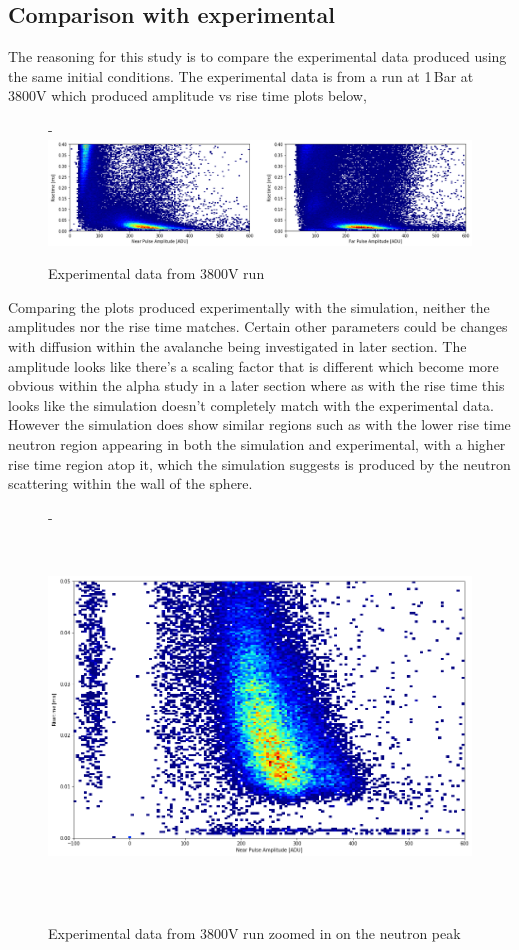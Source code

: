 \documentclass[a4paper]{article}
\begin{document}
\subsection{Comparison with experimental}
The reasoning for this study is to compare the experimental data produced using the same initial conditions. The experimental data is from a run at 1\,Bar at 3800V which produced amplitude vs rise time plots below,
\begin{figure}[H]-
        \centering
        \includegraphics[width=1\linewidth]{uk24n001_risehigh.png}
        \caption{Experimental data from 3800V run}
        \label{fig:south2d}
        \end{figure}
\noindent Comparing the plots produced experimentally with the simulation, neither the amplitudes nor the rise time matches. Certain other parameters could be changes with diffusion within the avalanche being investigated in later section. The amplitude looks like there's a scaling factor that is different which become more obvious within the alpha study in a later section where as with the rise time this looks like the simulation doesn't completely match with the experimental data.
\newline However the simulation does show similar regions such as with the lower rise time neutron region appearing in both the simulation and experimental, with a higher rise time region atop it, which the simulation suggests is produced by the neutron scattering within the wall of the sphere. 
\begin{figure}[H]-
        \centering
        \includegraphics[height=10cm]{uk24n001_rt_wout_phantom_2.png}
        \caption{Experimental data from 3800V run zoomed in on the neutron peak}
        \label{fig:south2d}
        \end{figure}
\end{document}
